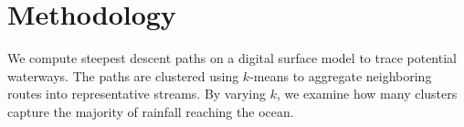 \section{Methodology}
We compute steepest descent paths on a digital surface model to trace potential waterways. The paths are clustered using $k$-means to aggregate neighboring routes into representative streams. By varying $k$, we examine how many clusters capture the majority of rainfall reaching the ocean.
